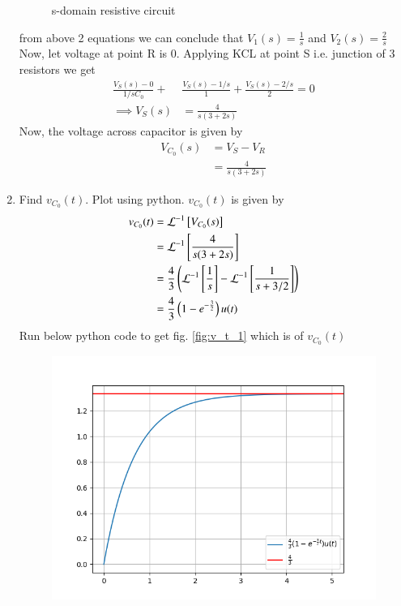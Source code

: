 \documentclass[journal,12pt,twocolumn]{IEEEtran}
\renewcommand\thesection{\arabic{section}}
\begin{document}
\begin{enumerate}[label=\arabic*.,ref=\thesection.\theenumi]
		\solution
\begin{figure}[!ht]
	
	\centering
	\caption{s-domain resistive circuit}
	\label{crct:2.6}
\end{figure}
		from above 2 equations we can conclude that $V_1(s)=\frac{1}{s}$ and $V_2(s)=\frac{2}{s}$
		Now, let voltage at point R is 0. Applying KCL at point S i.e. junction of 3 resistors we get
		\begin{align}
			\frac{V_S(s)-0}{1/sC_0}+&\frac{V_S(s)-1/s}{1}+\frac{V_S(s)-2/s}{2}=0\\
		\implies	V_S(s)&=\frac{4}{s(3+2s)}
		\end{align}
		Now, the voltage across capacitor is given by
		\begin{align}
			V_{C_0}(s)&=V_S-V_R\\
			&=\frac{4}{s(3+2s)}
		\end{align}
	\item Find $v_{C_0}(t)$.  Plot using python.
		\solution $v_{C_0}(t)$ is given by
			\begin{align}
				v_{C_0}(t)&=\mathcal{L}^{-1}{}\left[V_{C_0}(s)\right]\\
				&=\mathcal{L}^{-1}{}\left[\frac{4}{s(3+2s)}\right]\\
				&=\frac{4}{3}\left(\mathcal{L}^{-1}{}\left[\frac{1}{s}\right]-\mathcal{L}^{-1}{}\left[\frac{1}{s+3/2}\right]\right)\\
				&=\frac{4}{3}\left(1-e^{-\frac{3}{2}}\right)u(t)
				\end{align}
Run below python code to get fig. \ref{fig:v_t_1} which is of $v_{C_0}(t)$
\begin{figure}[!ht]
	\centering
	\includegraphics[width=\columnwidth]{./ques_2/v_t_1.png}

\end{figure}
\end{enumerate}
\end{document}

